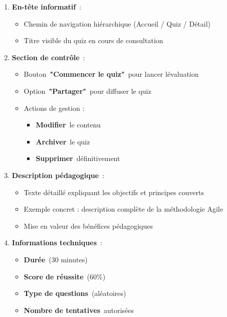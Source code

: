 \documentclass[12pt,a4paper,twoside]{report}
\begin{document}
\begin{enumerate}
\def\labelenumi{\arabic{enumi}.}
\item
  \textbf{En-tête informatif}~:

  \begin{itemize}
  \item
    Chemin de navigation hiérarchique (Accueil / Quiz / Détail)
  \item
    Titre visible du quiz en cours de consultation
  \end{itemize}
\item
  \textbf{Section de contrôle}~:

  \begin{itemize}
  \item
    Bouton~\textbf{"Commencer le quiz"}~pour lancer
    l\textquotesingle évaluation
  \item
    Option~\textbf{"Partager"}~pour diffuser le quiz
  \item
    Actions de gestion :

    \begin{itemize}
    \item
      \textbf{Modifier}~le contenu
    \item
      \textbf{Archiver}~le quiz
    \item
      \textbf{Supprimer}~définitivement
    \end{itemize}
  \end{itemize}
\item
  \textbf{Description pédagogique}~:

  \begin{itemize}
  \item
    Texte détaillé expliquant les objectifs et principes couverts
  \item
    Exemple concret : description complète de la méthodologie Agile
  \item
    Mise en valeur des bénéfices pédagogiques
  \end{itemize}
\item
  \textbf{Informations techniques}~:

  \begin{itemize}
  \item
    \textbf{Durée}~(30 minutes)
  \item
    \textbf{Score de réussite}~(60\%)
  \item
    \textbf{Type de questions}~(aléatoires)
  \item
    \textbf{Nombre de tentatives}~autorisées
  \end{itemize}
\end{enumerate}
\end{document}
